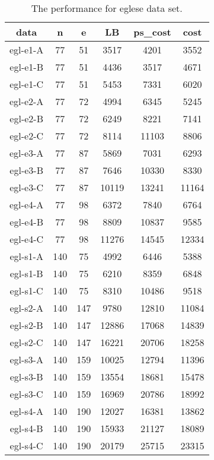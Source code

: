 \documentclass[conference,compsoc]{IEEEtran}
\begin{document}
\begin{appendix}
\begin{table}[htbp]
\begin{center}
\begin{tabular}{@{}cccccc@{}}
\toprule
data     & n   & e   & LB    & ps\_cost & cost  \\ \midrule
egl-e1-A & 77  & 51  & 3517  & 4201     & 3552  \\
egl-e1-B & 77  & 51  & 4436  & 3517     & 4671  \\
egl-e1-C & 77  & 51  & 5453  & 7331     & 6020  \\
egl-e2-A & 77  & 72  & 4994  & 6345     & 5245  \\
egl-e2-B & 77  & 72  & 6249  & 8221     & 7141  \\
egl-e2-C & 77  & 72  & 8114  & 11103    & 8806  \\
egl-e3-A & 77  & 87  & 5869  & 7031     & 6293  \\
egl-e3-B & 77  & 87  & 7646  & 10330    & 8330  \\
egl-e3-C & 77  & 87  & 10119 & 13241    & 11164 \\
egl-e4-A & 77  & 98  & 6372  & 7840     & 6764  \\
egl-e4-B & 77  & 98  & 8809  & 10837    & 9585  \\
egl-e4-C & 77  & 98  & 11276 & 14545    & 12334 \\
egl-s1-A & 140 & 75  & 4992  & 6446     & 5388  \\
egl-s1-B & 140 & 75  & 6210  & 8359     & 6848  \\
egl-s1-C & 140 & 75  & 8310  & 10486    & 9518  \\
egl-s2-A & 140 & 147 & 9780  & 12810    & 11084 \\
egl-s2-B & 140 & 147 & 12886 & 17068    & 14839 \\
egl-s2-C & 140 & 147 & 16221 & 20706    & 18258 \\
egl-s3-A & 140 & 159 & 10025 & 12794    & 11396 \\
egl-s3-B & 140 & 159 & 13554 & 18681    & 15478 \\
egl-s3-C & 140 & 159 & 16969 & 20786    & 18992 \\
egl-s4-A & 140 & 190 & 12027 & 16381    & 13862 \\
egl-s4-B & 140 & 190 & 15933 & 21127    & 18089 \\
egl-s4-C & 140 & 190 & 20179 & 25715    & 23315 \\ \bottomrule
\end{tabular}
\caption{The performance for eglese data set.}
\end{center}
\end{table}




\end{appendix}
\end{document}
